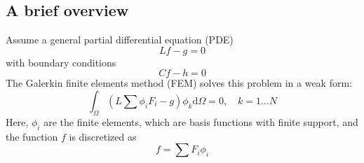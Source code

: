 \subsection{A brief overview}

Assume a general partial differential equation (PDE)
\begin{equation}
Lf - g = 0
\end{equation}
with boundary conditions
\begin{equation}
Cf - h = 0
\end{equation}
The Galerkin finite elements method (FEM) solves this problem
in a weak form:
\begin{equation}
\int_\Omega  {\left( {L\sum {{\phi _i}{F_i} - g} } \right){\phi _k}{\text{d}}\Omega }  = 0,\quad k = 1 \ldots N
\end{equation}
Here, $\phi_i$ are the finite elements, which are basis functions with
finite support, and the function $f$ is discretized as
\begin{equation}
f = \sum {{F_i}{\phi _i}} 
\end{equation}


